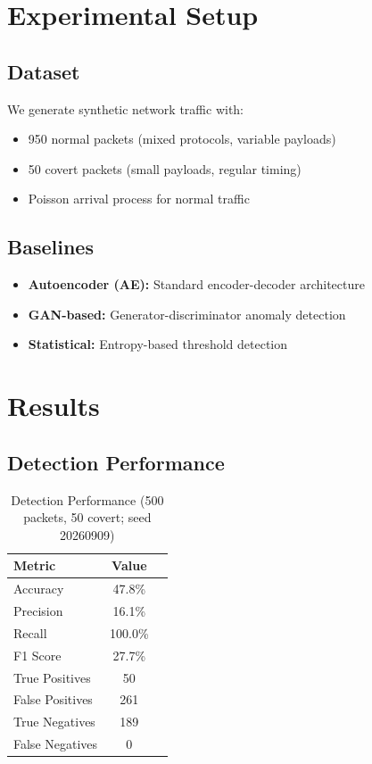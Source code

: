 \documentclass[sigconf]{acmart}
\begin{document}
\section{Experimental Setup}

\subsection{Dataset}

We generate synthetic network traffic with:
\begin{itemize}
\item 950 normal packets (mixed protocols, variable payloads)
\item 50 covert packets (small payloads, regular timing)
\item Poisson arrival process for normal traffic
\end{itemize}

\subsection{Baselines}

\begin{itemize}
\item \textbf{Autoencoder (AE):} Standard encoder-decoder architecture
\item \textbf{GAN-based:} Generator-discriminator anomaly detection
\item \textbf{Statistical:} Entropy-based threshold detection
\end{itemize}

\section{Results}

\subsection{Detection Performance}

\begin{table}[h]
\centering
\caption{Detection Performance (500 packets, 50 covert; seed 20260909)}
\begin{tabular}{lcc}
\toprule
Metric & Value \\
\midrule
Accuracy & 47.8\% \\
Precision & 16.1\% \\
Recall & 100.0\% \\
F1 Score & 27.7\% \\
True Positives & 50 \\
False Positives & 261 \\
True Negatives & 189 \\
False Negatives & 0 \\
\bottomrule
\end{tabular}
\end{table}
\end{document}
